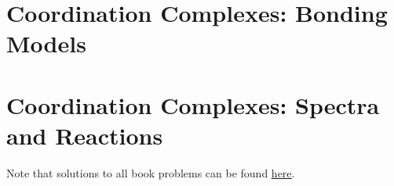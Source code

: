 \documentclass[titlepage]{article}
\begin{document}
\section{Coordination Complexes: Bonding Models}

\newpage



\section{Coordination Complexes: Spectra and Reactions}

\newpage



\renewcommand{\leftmark}{References}
\printbibliography[heading=bibintoc]

Note that solutions to all book problems can be found \href{https://www.chem.uci.edu/~lawm/107.html?fbclid=IwAR0mQljnCSONs96ZRMeseJbx-0psD2kslMZfl0nDnpq5SmcAnE0isXZU1C8}{\underline{here}}.
\end{document}
